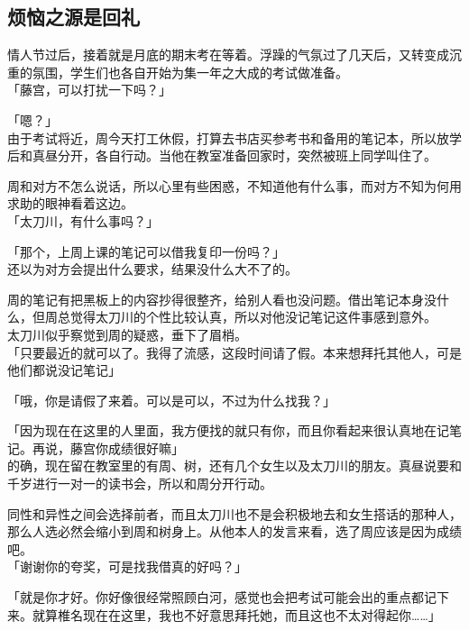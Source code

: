 \subsection{烦恼之源是回礼}

情人节过后，接着就是月底的期末考在等着。浮躁的气氛过了几天后，又转变成沉重的氛围，学生们也各自开始为集一年之大成的考试做准备。\\

「藤宫，可以打扰一下吗？」

「嗯？」\\

由于考试将近，周今天打工休假，打算去书店买参考书和备用的笔记本，所以放学后和真昼分开，各自行动。当他在教室准备回家时，突然被班上同学叫住了。

周和对方不怎么说话，所以心里有些困惑，不知道他有什么事，而对方不知为何用求助的眼神看着这边。\\

「太刀川，有什么事吗？」

「那个，上周上课的笔记可以借我复印一份吗？」\\

还以为对方会提出什么要求，结果没什么大不了的。

周的笔记有把黑板上的内容抄得很整齐，给别人看也没问题。借出笔记本身没什么，但周总觉得太刀川的个性比较认真，所以对他没记笔记这件事感到意外。\\

太刀川似乎察觉到周的疑惑，垂下了眉梢。\\

「只要最近的就可以了。我得了流感，这段时间请了假。本来想拜托其他人，可是他们都说没记笔记」

「哦，你是请假了来着。可以是可以，不过为什么找我？」

「因为现在在这里的人里面，我方便找的就只有你，而且你看起来很认真地在记笔记。再说，藤宫你成绩很好嘛」\\

的确，现在留在教室里的有周、树，还有几个女生以及太刀川的朋友。真昼说要和千岁进行一对一的读书会，所以和周分开行动。

同性和异性之间会选择前者，而且太刀川也不是会积极地去和女生搭话的那种人，那么人选必然会缩小到周和树身上。从他本人的发言来看，选了周应该是因为成绩吧。\\

「谢谢你的夸奖，可是找我借真的好吗？」

「就是你才好。你好像很经常照顾白河，感觉也会把考试可能会出的重点都记下来。就算椎名现在在这里，我也不好意思拜托她，而且这也不太对得起你……」\\

